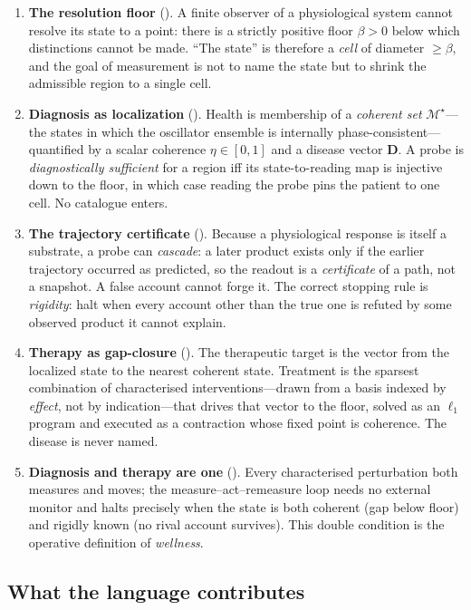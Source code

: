 \documentclass[11pt,a4paper]{article}
\theoremstyle{cfcthm}
\theoremstyle{definition}
\theoremstyle{remark}
\newcommand{\Man}{\mathcal{M}}          %
\newcommand{\Coh}{\Man^{\star}}         %
\newcommand{\flo}{\beta}                %
\newcommand{\ecoh}{\eta}                %
\newcommand{\dvec}{\mathbf{D}}          %
\begin{document}
\begin{enumerate}[leftmargin=1.5em,itemsep=3pt]
\item \textbf{The resolution floor} (). A finite observer of a
physiological system cannot resolve its state to a point: there is a strictly
positive floor $\flo>0$ below which distinctions cannot be made. ``The state''
is therefore a \emph{cell} of diameter $\ge\flo$, and the goal of measurement
is not to name the state but to shrink the admissible region to a single cell.
\item \textbf{Diagnosis as localization} ().
Health is membership of a \emph{coherent set} $\Coh$---the states in which the
oscillator ensemble is internally phase-consistent---quantified by a scalar
coherence $\ecoh\in[0,1]$ and a disease vector $\dvec$. A probe is
\emph{diagnostically sufficient} for a region iff its state-to-reading map is
injective down to the floor, in which case reading the probe pins the patient
to one cell. No catalogue enters.
\item \textbf{The trajectory certificate} (). Because a
physiological response is itself a substrate, a probe can \emph{cascade}: a
later product exists only if the earlier trajectory occurred as predicted, so
the readout is a \emph{certificate} of a path, not a snapshot. A false account
cannot forge it. The correct stopping rule is \emph{rigidity}: halt when every
account other than the true one is refuted by some observed product it cannot
explain.
\item \textbf{Therapy as gap-closure} (). The therapeutic
target is the vector from the localized state to the nearest coherent state.
Treatment is the sparsest combination of characterised interventions---drawn
from a basis indexed by \emph{effect}, not by indication---that drives that
vector to the floor, solved as an $\ell_1$ program and executed as a
contraction whose fixed point is coherence. The disease is never named.
\item \textbf{Diagnosis and therapy are one} (). Every
characterised perturbation both measures and moves; the measure--act--remeasure
loop needs no external monitor and halts precisely when the state is both
coherent (gap below floor) and rigidly known (no rival account survives). This
double condition is the operative definition of \emph{wellness}.
\end{enumerate}

\subsection{What the language contributes}
\end{document}
